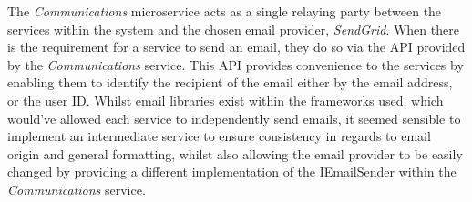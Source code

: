 The \textit{Communications} microservice acts as a single relaying party between the services within the system and the chosen email provider, \textit{SendGrid}. When there is the requirement for a service to send an email, they do so via the API provided by the \textit{Communications} service. This API provides convenience to the services by enabling them to identify the recipient of the email either by the email address, or the user ID. Whilst email libraries exist within the frameworks used, which would've allowed each service to independently send emails, it seemed sensible to implement an intermediate service to ensure consistency in regards to email origin and general formatting, whilst also allowing the email provider to be easily changed by providing a different implementation of the IEmailSender within the \textit{Communications} service.
